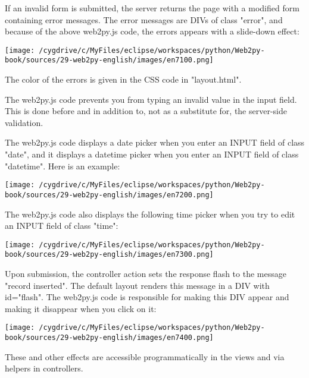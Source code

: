 \documentclass[justified,sixbynine,notoc]{tufte-book}
\begin{document}
\begin{fullwidth}
If an invalid form is submitted, the server returns the page with a modified form containing error messages. The error messages are DIVs of class "error", and because of the above web2py.js code, the errors appears with a slide-down effect:


\goodbreak\begin{center}\texttt{[image: /cygdrive/c/MyFiles/eclipse/workspaces/python/Web2py-book/sources/29-web2py-english/images/en7100.png]}\end{center}


The color of the errors is given in the CSS code in "layout.html".

The web2py.js code prevents you from typing an invalid value in the input field. This is done before and in addition to, not as a substitute for, the server-side validation.

The web2py.js code displays a date picker when you enter an INPUT field of class "date", and it displays a datetime picker when you enter an INPUT field of class "datetime". Here is an example:


\goodbreak\begin{center}\texttt{[image: /cygdrive/c/MyFiles/eclipse/workspaces/python/Web2py-book/sources/29-web2py-english/images/en7200.png]}\end{center}


The web2py.js code also displays the following time picker when you try to edit an INPUT field of class "time":


\goodbreak\begin{center}\texttt{[image: /cygdrive/c/MyFiles/eclipse/workspaces/python/Web2py-book/sources/29-web2py-english/images/en7300.png]}\end{center}


Upon submission, the controller action sets the response flash to the message "record inserted". The default layout renders this message in a DIV with id="flash". The web2py.js code is responsible for making this DIV appear and making it disappear when you click on it:


\goodbreak\begin{center}\texttt{[image: /cygdrive/c/MyFiles/eclipse/workspaces/python/Web2py-book/sources/29-web2py-english/images/en7400.png]}\end{center}


These and other effects are accessible programmatically in the views and via helpers in controllers.


\end{fullwidth}
\end{document}

